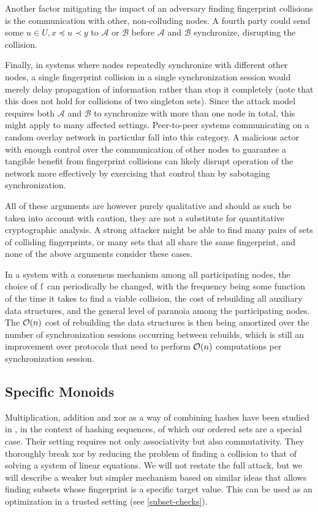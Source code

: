 Another factor mitigating the impact of an adversary finding fingerprint collisions is the communication with other, non-colluding nodes. A fourth party could send some $u \in U, x \preceq u \prec y$ to $\mathcal{A}$ or $\mathcal{B}$ before $\mathcal{A}$ and $\mathcal{B}$ synchronize, disrupting the collision.

Finally, in systems where nodes repeatedly synchronize with different other nodes, a single fingerprint collision in a single synchronization session would merely delay propagation of information rather than stop it completely (note that this does not hold for collisions of two singleton sets). Since the attack model requires both $\mathcal{A}$ and $\mathcal{B}$ to synchronize with more than one node in total, this might apply to many affected settings. Peer-to-peer systems communicating on a random overlay network in particular fall into this category. A malicious actor with enough control over the communication of other nodes to guarantee a tangible benefit from fingerprint collisions can likely disrupt operation of the network more effectively by exercising that control than by sabotaging synchronization.

All of these arguments are however purely qualitative and should as such be taken into account with caution, they are not a substitute for quantitative cryptographic analysis. A strong attacker might be able to find many pairs of sets of colliding fingerprints, or many sets that all share the same fingerprint, and none of the above arguments consider these cases.

In a system with a consensus mechanism among all participating nodes, the choice of $\operatorname{f}$ can periodically be changed, with the frequency being some function of the time it takes to find a viable collision, the cost of rebuilding all auxiliary data structures, and the general level of paranoia among the participating nodes. The $\mathcal{O}(n)$ cost of rebuilding the data structures is then being amortized over the number of synchronization sessions occurring between rebuilds, which is still an improvement over protocols that need to perform $\mathcal{O}(n)$ computations per synchronization session.

\subsection{Specific Monoids}

Multiplication, addition and xor as a way of combining hashes have been studied in \cite{bellare1997new}, in the context of hashing sequences, of which our ordered sets are a special case. Their setting requires not only associativity but also commutativity. They thoroughly break xor by reducing the problem of finding a collision to that of solving a system of linear equations. We will not restate the full attack, but we will describe a weaker but simpler mechanism based on similar ideas that allows finding subsets whose fingerprint is a specific target value. This can be used as an optimization in a trusted setting (see \cref{subset-checks}).

